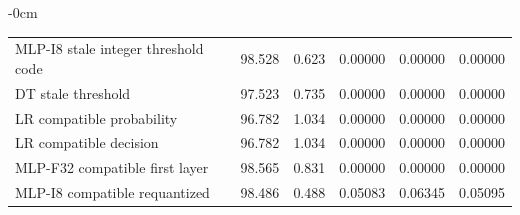 \begin{table}[!htbp]
\begin{adjustwidth}{-\extralength}{0cm}
\begin{tabular}{lrrrrr}
MLP-I8 stale integer threshold code & 98.528 & 0.623 & 0.00000 & 0.00000 & 0.00000\\
DT stale threshold & 97.523 & 0.735 & 0.00000 & 0.00000 & 0.00000\\
LR compatible probability & 96.782 & 1.034 & 0.00000 & 0.00000 & 0.00000\\
LR compatible decision & 96.782 & 1.034 & 0.00000 & 0.00000 & 0.00000\\
MLP-F32 compatible first layer & 98.565 & 0.831 & 0.00000 & 0.00000 & 0.00000\\
MLP-I8 compatible requantized & 98.486 & 0.488 & 0.05083 & 0.06345 & 0.05095\\
\bottomrule\end{tabular}
\end{adjustwidth}
\end{table}
